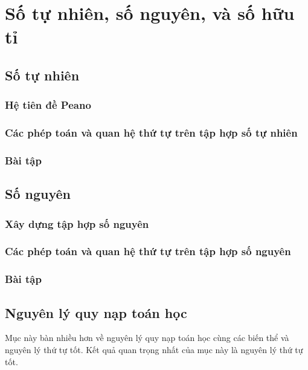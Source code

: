 \chapter{Số tự nhiên, số nguyên, và số hữu tỉ}\label{chapter:natural-numbers-integers-and-rationals}

\section{Số tự nhiên}

\subsection{Hệ tiên đề Peano}

\subsection{Các phép toán và quan hệ thứ tự trên tập hợp số tự nhiên}

\subsection{Bài tập}

\section{Số nguyên}

\subsection{Xây dựng tập hợp số nguyên}

\subsection{Các phép toán và quan hệ thứ tự trên tập hợp số nguyên}

\subsection{Bài tập}

\section{Nguyên lý quy nạp toán học}

Mục này bàn nhiều hơn về nguyên lý quy nạp toán học cùng các biến thể và nguyên lý thứ tự tốt. Kết quả quan trọng nhất của mục này là nguyên lý thứ tự tốt.

